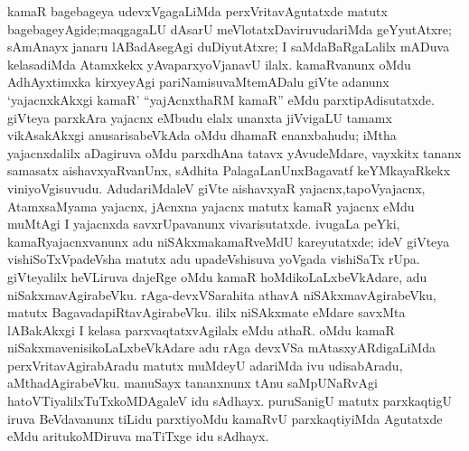 kamaR bagebageya udevxVgagaLiMda perxVritavAgutatxde matutx bagebageyAgide;\break maqgagaLU dAsarU meVlotatxDaviruvudariMda geYyutAtxre; sAmAnayx janaru lABa\-dAsegAgi duDiyutAtxre; I saMdaBaRgaLalilx mADuva kelasadiMda Atamxkekx yAva\break parxyoVjanavU ilalx. kamaRvanunx oMdu AdhAyxtimxka kirxyeyAgi pariNamisuvaMte\break mADalu giVte adanunx `yajacnxkAkxgi kamaR' ``yajAcnxthaRM kamaR'' eMdu parxtipAdi\-sutatxde. giVteya parxkAra yajacnx eMbudu elalx unanxta jiVvigaLU tamamx vikAsakAkxgi anusarisabeVkAda oMdu dhamaR enanxbahudu; iMtha yajacnxdalilx aDagiruva oMdu parxdhAna tatavx yAvudeMdare, vayxkitx tananx samasatx aishavxyaRvanUnx, sAdhita PalagaLanUnx\break Bagavatf keYMkayaRkekx viniyoVgisuvudu. AdudariMdaleV giVte aishavxyaR yajacnx,\break tapoVyajacnx, AtamxsaMyama yajacnx, jAcnxna yajacnx matutx kamaR yajacnx eMdu \hbox{muMtAgi} I yajacnxda savxrUpavanunx vivarisutatxde. ivugaLa peYki, kamaRyajacnxvanunx adu \break niSAkxmakamaRveMdU kareyutatxde; ideV giVteya vishiSoTxVpadeVsha matutx adu upa\-deVshisuva yoVgada vishiSaTx rUpa. giVteyalilx heVLiruva dajeRge oMdu kamaR hoMdikoLaLxbeVkAdare, adu niSakxmavAgirabeVku. rAga-devxVSarahita athavA niSAkxma\-vAgirabeVku, matutx BagavadapiRtavAgirabeVku. ililx niSAkxmate eMdare savxMta lABakAkxgi I kelasa parxvaqtatxvAgilalx eMdu athaR. oMdu kamaR niSakxmavenisikoLaLxbeVkAdare adu rAga devxVSa mAtasxyARdigaLiMda perxVritavAgirabAradu matutx muMdeyU adariMda ivu udisabAradu, aMthadAgirabeVku. manuSayx tananxnunx tAnu saMpUNaRvAgi hatoVTiyalilxTuTxkoMDAgaleV idu sAdhayx. puruSanigU matutx parxkaqtigU iruva BeVdavanunx tiLidu parxtiyoMdu kamaRvU parxkaqtiyiMda Agutatxde eMdu aritukoMDiruva maTiTxge idu sAdhayx.

